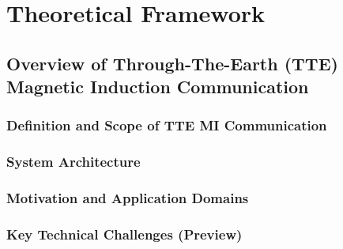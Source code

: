 \chapter{Theoretical Framework}\label{ch:theoretical-framework}


\section{Overview of Through-The-Earth (TTE) Magnetic Induction Communication}\label{sec:overview-mI-TTE}
\subsection{Definition and Scope of TTE MI Communication}

\subsection{System Architecture}\label{subsec:system-architecture}

\subsection{Motivation and Application Domains}\label{subsec:motivation-applications}

\subsection{Key Technical Challenges (Preview)}\label{subsec:key-challenges-preview}

